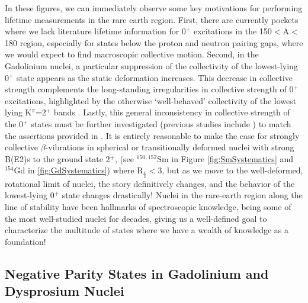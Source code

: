In these figures, we can immediately observe some key motivations for performing lifetime measurements in the rare earth region. First, there are currently pockets where we lack literature lifetime information for 0$^+$ excitations in the 150$<$A$<$180 region, especially for states below the proton and neutron pairing gaps, where we would expect to find macroscopic collective motion. Second, in the Gadolinium nuclei, a particular suppression of the collectivity of the lowest-lying 0$^+$ state appears as the static deformation increases. This decrease in collective strength complements the long-standing irregularities in collective strength of 0$^+$ excitations, highlighted by the otherwise `well-behaved' collectivity of the lowest lying K$^\pi$=2$^+$ bands \cite{Casten_0plusbehavior2005, Bonatsos_collective02009}. Lastly, this general inconsistency in collective strength of the 0$^+$ states must be further investigated (previous studies include \cite{Sharpey-Schafer2011,SharpeySchafer_beta2011,Garrett_02_beta}) to match the assertions provided in \cite{RevModPhys.83.1467}. It is entirely reasonable to make the case for strongly collective $\beta$-vibrations in spherical or transitionally deformed nuclei with strong B(E2)s to the ground state 2$^+$, (see $^{150,152}$Sm in Figure \ref{fig:SmSystematics} and $^{154}$Gd in \ref{fig:GdSystematics}) where R$_{\frac{4}{2}}<$3, but as we move to the well-deformed, rotational limit of nuclei, the story definitively changes, and the behavior of the lowest-lying 0$^+$ state changes drastically! Nuclei in the rare-earth region along the line of stability have been hallmarks of spectroscopic knowledge, being some of the most well-studied nuclei for decades, giving us a well-defined goal to characterize the multitude of states where we have a wealth of knowledge as a foundation!










\subsection{Negative Parity States in Gadolinium and Dysprosium Nuclei}


